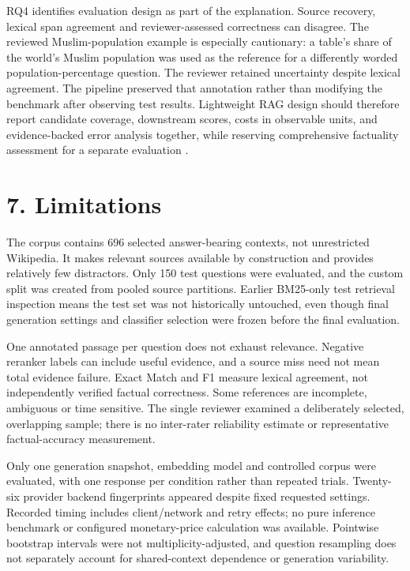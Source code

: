 \documentclass[
  11pt,
]{article}
\begin{document}
RQ4 identifies evaluation design as part of the explanation. Source
recovery, lexical span agreement and reviewer-assessed correctness can
disagree. The reviewed Muslim-population example is especially
cautionary: a table's share of the world's Muslim population was used as
the reference for a differently worded population-percentage question.
The reviewer retained uncertainty despite lexical agreement. The
pipeline preserved that annotation rather than modifying the benchmark
after observing test results. Lightweight RAG design should therefore
report candidate coverage, downstream scores, costs in observable units,
and evidence-backed error analysis together, while reserving
comprehensive factuality assessment for a separate evaluation
\citep{factscore}.

\hypertarget{limitations}{%
\section{7. Limitations}\label{limitations}}

The corpus contains 696 selected answer-bearing contexts, not
unrestricted Wikipedia. It makes relevant sources available by
construction and provides relatively few distractors. Only 150 test
questions were evaluated, and the custom split was created from pooled
source partitions. Earlier BM25-only test retrieval inspection means the
test set was not historically untouched, even though final generation
settings and classifier selection were frozen before the final
evaluation.

One annotated passage per question does not exhaust relevance. Negative
reranker labels can include useful evidence, and a source miss need not
mean total evidence failure. Exact Match and F1 measure lexical
agreement, not independently verified factual correctness. Some
references are incomplete, ambiguous or time sensitive. The single
reviewer examined a deliberately selected, overlapping sample; there is
no inter-rater reliability estimate or representative factual-accuracy
measurement.

Only one generation snapshot, embedding model and controlled corpus were
evaluated, with one response per condition rather than repeated trials.
Twenty-six provider backend fingerprints appeared despite fixed
requested settings. Recorded timing includes client/network and retry
effects; no pure inference benchmark or configured monetary-price
calculation was available. Pointwise bootstrap intervals were not
multiplicity-adjusted, and question resampling does not separately
account for shared-context dependence or generation variability.
\end{document}
